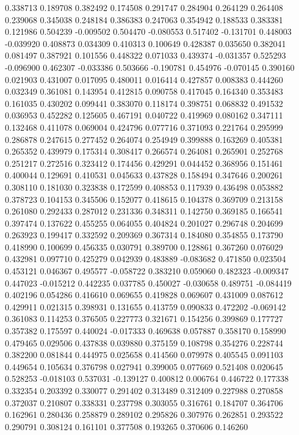 0.338713
0.189708
0.382492
0.174508
0.291747
0.284904
0.264129
0.264408
0.239068
0.345038
0.248184
0.386383
0.247063
0.354942
0.188533
0.383381
0.121986
0.504239
-0.009502
0.504470
-0.080553
0.517402
-0.131701
0.448003
-0.039920
0.408873
0.034309
0.410313
0.100649
0.428387
0.035650
0.382041
0.081497
0.387921
0.101556
0.448322
0.071033
0.439374
-0.031357
0.525293
-0.096900
0.462307
-0.033386
0.503666
-0.190781
0.454976
-0.070145
0.390160
0.021903
0.431007
0.017095
0.480011
0.016414
0.427857
0.008383
0.444260
0.032349
0.361081
0.143954
0.412815
0.090758
0.417045
0.164340
0.353483
0.161035
0.430202
0.099441
0.383070
0.118174
0.398751
0.068832
0.491532
0.036953
0.452282
0.125605
0.467191
0.040722
0.419969
0.080162
0.347111
0.132468
0.411078
0.069004
0.424796
0.077716
0.371093
0.221764
0.295999
0.286878
0.247615
0.277452
0.264074
0.254949
0.399888
0.163269
0.405381
0.265352
0.439979
0.175314
0.308417
0.266574
0.264081
0.265901
0.252768
0.251217
0.272516
0.323412
0.174456
0.429291
0.044452
0.368956
0.151461
0.400044
0.129691
0.410531
0.045633
0.437828
0.158494
0.347646
0.200261
0.308110
0.181030
0.323838
0.172599
0.408853
0.117939
0.436498
0.053882
0.378723
0.104153
0.345506
0.152077
0.418615
0.104378
0.369709
0.213158
0.261080
0.292433
0.287012
0.231336
0.348311
0.142750
0.369185
0.166541
0.397474
0.137622
0.455255
0.064055
0.404824
0.201027
0.296748
0.204699
0.263923
0.199417
0.332592
0.209369
0.367314
0.184080
0.354855
0.173790
0.418990
0.100699
0.456335
0.030791
0.389700
0.128861
0.367260
0.076029
0.432981
0.097710
0.425279
0.042939
0.483889
-0.083682
0.471850
0.023504
0.453121
0.046367
0.495577
-0.058722
0.383210
0.059060
0.482323
-0.009347
0.447023
-0.015212
0.442235
0.037785
0.450027
-0.030658
0.489751
-0.084419
0.402196
0.054286
0.416610
0.069655
0.419828
0.069607
0.431009
0.087612
0.429911
0.021315
0.398931
0.131655
0.413759
0.090833
0.472202
-0.069142
0.361083
0.114253
0.376505
0.227773
0.321671
0.154256
0.399869
0.177727
0.357382
0.175597
0.440024
-0.017333
0.469638
0.057887
0.358170
0.158990
0.479465
0.029506
0.437838
0.039880
0.375159
0.108798
0.354276
0.228744
0.382200
0.081844
0.444975
0.025658
0.414560
0.079978
0.405545
0.091103
0.449654
0.105634
0.376798
0.027941
0.399005
0.077669
0.521408
0.020645
0.528253
-0.018103
0.537031
-0.139127
0.400812
0.006764
0.446722
0.177338
0.332354
0.203392
0.330077
0.291402
0.313489
0.312409
0.227988
0.270858
0.372037
0.210807
0.338331
0.237798
0.303055
0.316761
0.184707
0.364706
0.162961
0.280436
0.258879
0.289102
0.295826
0.307976
0.262851
0.293522
0.290791
0.308124
0.161101
0.377508
0.193265
0.370606
0.146260
